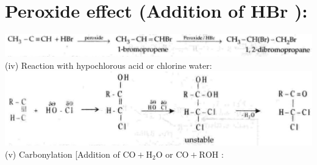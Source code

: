 \documentclass[10pt]{article}
\begin{document}
\section*{Peroxide effect (Addition of HBr ):}
\includegraphics[max width=\textwidth, center]{2025_01_28_8470952b98110cec3aabg-190(5)}\\
(iv) Reaction with hypochlorous acid or chlorine water:\\
\includegraphics[max width=\textwidth, center]{2025_01_28_8470952b98110cec3aabg-190(7)}\\
(v) Carbonylation [Addition of $\mathrm{CO}+\mathrm{H}_{2} \mathrm{O}$ or $\mathrm{CO}+\mathrm{ROH}$ :
\end{document}
